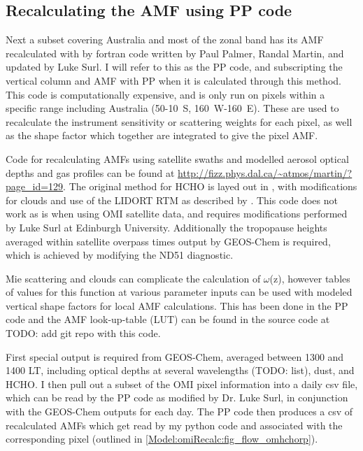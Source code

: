     
  \subsection{Recalculating the AMF using PP code}
    \label{Model:omiRecalc:ppcode}
    Next a subset covering Australia and most of the zonal band has its AMF recalculated with by fortran code written by Paul Palmer, Randal Martin, and updated by Luke Surl.
    I will refer to this as the PP code, and subscripting the vertical column and AMF with PP when it is calculated through this method.
    This code is computationally expensive, and is only run on pixels within a specific range including Australia (50-10\degr~S, 160\degr~W-160\degr~E).
    These are used to recalculate the instrument sensitivity or scattering weights for each pixel, as well as the shape factor which together are integrated to give the pixel AMF.
    
    
    Code for recalculating AMFs using satellite swaths and modelled aerosol optical depths and gas profiles can be found at \url{http://fizz.phys.dal.ca/~atmos/martin/?page_id=129}. 
    The original method for HCHO is layed out in \textcite{Palmer2001}, with modifications for clouds and use of the LIDORT RTM \parencite{Spurr2002} as described by \textcite{Martin2003}.
    This code does not work as is when using OMI satellite data, and requires modifications performed by Luke Surl at Edinburgh University.
    Additionally the tropopause heights averaged within satellite overpass times output by GEOS-Chem is required, which is achieved by modifying the ND51 diagnostic.
    
    Mie scattering and clouds can complicate the calculation of $\omega$(z), however tables of values for this function at various parameter inputs can be used with modeled vertical shape factors for local AMF calculations.
    This has been done in the PP code and the AMF look-up-table (LUT) can be found in the source code at TODO: add git repo with this code.
    
    First special output is required from GEOS-Chem, averaged between 1300 and 1400 LT, including optical depths at several wavelengths (TODO: list), dust, and HCHO.
    I then pull out a subset of the OMI pixel information into a daily csv file, which can be read by the PP code as modified by Dr. Luke Surl, in conjunction with the GEOS-Chem outputs for each day.
    The PP code then produces a csv of recalculated AMFs which get read by my python code and associated with the corresponding pixel (outlined in \ref{Model:omiRecalc:fig_flow_omhchorp}).
    
